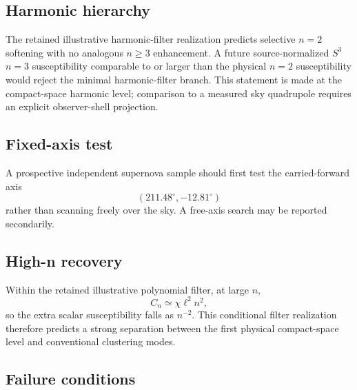 \subsection{Harmonic hierarchy}

The retained illustrative harmonic-filter realization predicts selective \(n=2\) softening with no analogous \(n\ge3\) enhancement. A future source-normalized \(S^3\) \(n=3\) susceptibility comparable to or larger than the physical \(n=2\) susceptibility would reject the minimal harmonic-filter branch. This statement is made at the compact-space harmonic level; comparison to a measured sky quadrupole requires an explicit observer-shell projection.

\subsection{Fixed-axis test}

A prospective independent supernova sample should first test the carried-forward axis
\[
(211.48^\circ,-12.81^\circ)
\]
rather than scanning freely over the sky. A free-axis search may be reported secondarily.

\subsection{High-n recovery}

Within the retained illustrative polynomial filter, at large \(n\),
\[
C_n\simeq\chi\ell^2n^2,
\]
so the extra scalar susceptibility falls as \(n^{-2}\). This conditional filter realization therefore predicts a strong separation between the first physical compact-space level and conventional clustering modes.

\subsection{Failure conditions}

